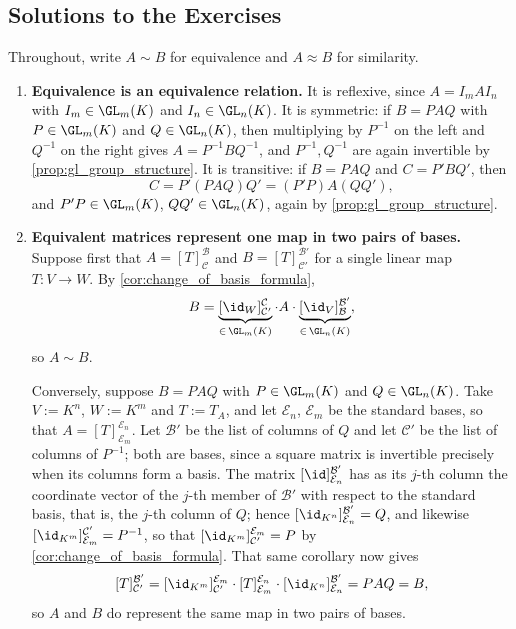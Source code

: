 \subsection{Solutions to the Exercises}
\label{sec:solutions_change_of_basis}

\begin{exercisesolution}
\label{sol:equivalence_similarity_properties}
Throughout, write $A \sim B$ for equivalence and $A \approx B$ for similarity.

\begin{enumerate}[label=\textbf{(\alph*)}]
    \item \textbf{Equivalence is an equivalence relation.} It is reflexive, since $A = I_m A I_n$ with $I_m \in \GL_m(K)$ and $I_n \in \GL_n(K)$. It is symmetric: if $B = PAQ$ with $P \in \GL_m(K)$ and $Q \in \GL_n(K)$, then multiplying by $P^{-1}$ on the left and $Q^{-1}$ on the right gives $A = P^{-1} B Q^{-1}$, and $P^{-1}, Q^{-1}$ are again invertible by \cref{prop:gl_group_structure}. It is transitive: if $B = PAQ$ and $C = P'BQ'$, then
    \[
    C = P'(PAQ)Q' = (P'P) A (QQ'),
    \]
    and $P'P \in \GL_m(K)$, $QQ' \in \GL_n(K)$, again by \cref{prop:gl_group_structure}.

    \item \textbf{Equivalent matrices represent one map in two pairs of bases.} Suppose first that $A = [T]_{\mathcal{C}}^{\mathcal{B}}$ and $B = [T]_{\mathcal{C}'}^{\mathcal{B}'}$ for a single linear map $T: V \to W$. By \cref{cor:change_of_basis_formula},
    \[
    B = \underbrace{[\id_W]_{\mathcal{C}'}^{\mathcal{C}}}_{\in \, \GL_m(K)} \cdot A \cdot \underbrace{[\id_V]_{\mathcal{B}}^{\mathcal{B}'}}_{\in \, \GL_n(K)},
    \]
    so $A \sim B$.

    Conversely, suppose $B = PAQ$ with $P \in \GL_m(K)$ and $Q \in \GL_n(K)$. Take $V := K^n$, $W := K^m$ and $T := T_A$, and let $\mathcal{E}_n$, $\mathcal{E}_m$ be the standard bases, so that $A = [T]_{\mathcal{E}_m}^{\mathcal{E}_n}$. Let $\mathcal{B}'$ be the list of columns of $Q$ and let $\mathcal{C}'$ be the list of columns of $P^{-1}$; both are bases, since a square matrix is invertible precisely when its columns form a basis. The matrix $[\id]_{\mathcal{E}_n}^{\mathcal{B}'}$ has as its $j$-th column the coordinate vector of the $j$-th member of $\mathcal{B}'$ with respect to the standard basis, that is, the $j$-th column of $Q$; hence $[\id_{K^n}]_{\mathcal{E}_n}^{\mathcal{B}'} = Q$, and likewise $[\id_{K^m}]_{\mathcal{E}_m}^{\mathcal{C}'} = P^{-1}$, so that $[\id_{K^m}]_{\mathcal{C}'}^{\mathcal{E}_m} = P$ by \cref{cor:change_of_basis_formula}. That same corollary now gives
    \[
    [T]_{\mathcal{C}'}^{\mathcal{B}'} = [\id_{K^m}]_{\mathcal{C}'}^{\mathcal{E}_m} \cdot [T]_{\mathcal{E}_m}^{\mathcal{E}_n} \cdot [\id_{K^n}]_{\mathcal{E}_n}^{\mathcal{B}'} = P A Q = B,
    \]
    so $A$ and $B$ do represent the same map in two pairs of bases.


\end{enumerate}
\end{exercisesolution}
